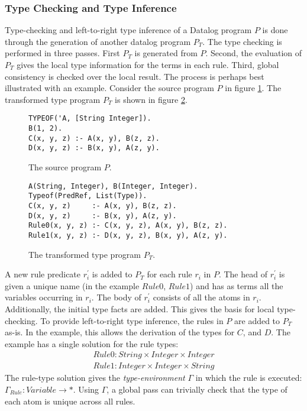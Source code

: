 \subsubsection{Type Checking and Type Inference}
Type-checking and left-to-right type inference of a Datalog program $P$ is done through the generation of another datalog program $P_T$. The type checking is performed in three passes. First $P_T$ is generated from $P$. Second, the evaluation of $P_T$ gives the local type information for the terms in each rule. Third, global consistency is checked over the local result. The process is perhaps best illustrated with an example. Consider the source program $P$ in figure \ref{figure:sourceP}. The transformed type program $P_T$ is shown in figure \ref{figure:sourcePT}.
\begin{figure}[!ht]
\begin{verbatim}
TYPEOF('A, [String Integer]).
B(1, 2).
C(x, y, z) :- A(x, y), B(z, z).
D(x, y, z) :- B(x, y), A(z, y).
\end{verbatim}
\caption{The source program $P$.}
\label{figure:sourceP}
\end{figure}
\vspace*{-20pt}
\begin{figure}[!ht]
\begin{verbatim}
A(String, Integer), B(Integer, Integer).
Typeof(PredRef, List(Type)).
C(x, y, z)     :- A(x, y), B(z, z).
D(x, y, z)     :- B(x, y), A(z, y).
Rule0(x, y, z) :- C(x, y, z), A(x, y), B(z, z).
Rule1(x, y, z) :- D(x, y, z), B(x, y), A(z, y).
\end{verbatim}
\caption{The transformed type program $P_T$.}
\label{figure:sourcePT}
\end{figure}
\noindent
A new rule predicate $r^{'}_i$ is added to $P_T$ for each rule $r_i$ in $P$. The head of $r^{'}_i$ is given a unique name (in the example $Rule0$, $Rule1$) and has as terms all the variables occurring in $r_i$. The body of $r^{'}_i$ consists of all the atoms in $r_i$. Additionally, the initial type facts are added. This gives the basis for local type-checking. To provide left-to-right type inference, the rules in $P$ are added to $P_T$ as-is. In the example, this allows the derivation of the types for $C$, and $D$. 
The example has a single solution for the rule types:
\begin{align*}
Rule0 : String  \times Integer \times Integer\\
Rule1 : Integer \times Integer \times String
\end{align*}
The rule-type solution gives the \textit{type-environment} $\Gamma$ in which the rule is executed: $\Gamma_{Rule} : Variable \rightarrow *$. Using $\Gamma$, a global pass can trivially check that the type of each atom is unique across all rules.


